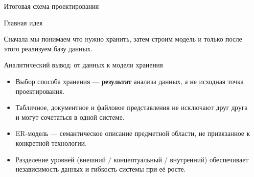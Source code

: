 \documentclass[aspectratio=169]{beamer}
\begin{document}
\begin{frame}{Итоговая схема проектирования}


\vspace{0.6cm}

\begin{center}


\end{center}

\vspace{0.5cm}

\begin{alertblock}{Главная идея}

Сначала мы понимаем что нужно хранить, затем строим модель и только после этого реализуем базу данных.

\end{alertblock}

\end{frame}


\begin{frame}{Аналитический вывод: от данных к модели хранения}

\begin{itemize}
  \item Выбор способа хранения — \textbf{результат} анализа
        данных, а не исходная точка проектирования.
  \item Табличное, документное и файловое представления
        не исключают друг друга и могут сочетаться
        в одной системе.
  \item ER-модель — семантическое описание предметной
        области, не привязанное к конкретной технологии.
  \item Разделение уровней (внешний / концептуальный /
        внутренний) обеспечивает независимость данных
        и гибкость системы при её росте.
\end{itemize}

\end{frame}
\end{document}

